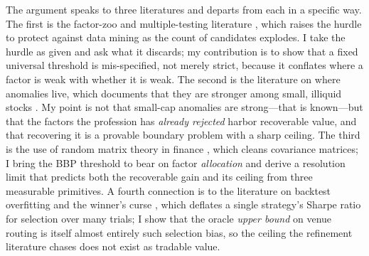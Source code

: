 \documentclass[12pt]{article}
\theoremstyle{plain}
\theoremstyle{definition}
\begin{document}
The argument speaks to three literatures and departs from each in a specific
way. The first is the factor-zoo and multiple-testing literature
\citep{HarveyLiuZhu2016,McLeanPontiff2016,ChordiaGoyalSaretto2020}, which raises
the hurdle to protect against data mining as the count of candidates explodes. I
take the hurdle as given and ask what it discards; my contribution is to show
that a fixed universal threshold is mis-specified, not merely strict, because it
conflates where a factor is weak with whether it is weak. The second is the
literature on where anomalies live, which documents that they are stronger among
small, illiquid stocks \citep{FamaFrench2008,IsraelMoskowitz2013}. My point is
not that small-cap anomalies are strong---that is known---but that the factors
the profession has \emph{already rejected} harbor recoverable value, and that
recovering it is a provable boundary problem with a sharp ceiling. The third is
the use of random matrix theory in finance
\citep{BaikBenArousPeche2005,Paul2007,BenaychNadakuditi2011,BunBouchaudPotters2017},
which cleans covariance matrices; I bring the BBP threshold to bear on factor
\emph{allocation} and derive a resolution limit that predicts both the
recoverable gain and its ceiling from three measurable primitives. A fourth
connection is to the literature on backtest overfitting and the winner's curse
\citep{HarveyLiu2015,BaileyLopezdePrado2014,HarveyLiuZhu2016}, which deflates a
single strategy's Sharpe ratio for selection over many trials; I show that the
oracle \emph{upper bound} on venue routing is itself almost entirely such
selection bias, so the ceiling the refinement literature chases does not exist as
tradable value.
\end{document}
